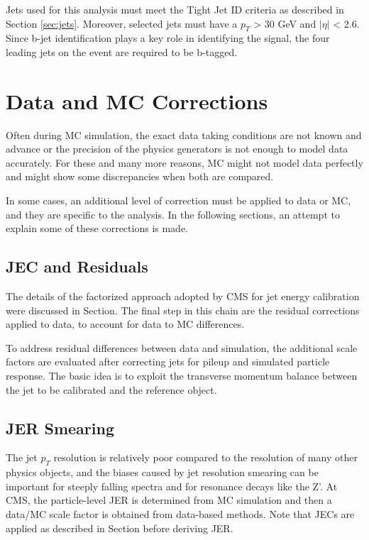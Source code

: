Jets used for this analysis must meet the Tight Jet ID criteria as described in Section \ref{sec:jets}. Moreover, selected jets must have a $p_{T}$ > 30 GeV and $|\eta|$ < 2.6. Since b-jet identification plays a key role in identifying the signal, the four leading jets on the event are required to be b-tagged. 

\section{Data and MC Corrections}

Often during MC simulation, the exact data taking conditions are not known and advance or the precision of the physics generators is not enough to model data accurately. For these and many more reasons, MC might not model data perfectly and might show some discrepancies when both are compared.

In some cases, an additional level of correction must be applied to data or MC, and they are specific to the analysis. In the following sections, an attempt to explain some of these corrections is made.

\subsection{JEC and Residuals}
The details of the factorized approach adopted by CMS for jet energy calibration were discussed in Section. The final step in this chain are the residual corrections applied to data, to account for data to MC differences.

To address residual differences between data and simulation, the additional scale factors are evaluated after correcting jets for pileup and simulated particle response. The basic idea is to exploit the transverse momentum balance between the jet to be calibrated and the reference object.

\subsection{JER Smearing}
The jet $p_{T}$ resolution is relatively poor compared to the resolution of many other physics objects, and the biases caused by jet resolution smearing can be important for steeply falling spectra and for resonance decays like the Z'. At CMS, the particle-level JER is determined from MC simulation and then a data/MC scale factor is obtained from data-based methods. Note that JECs are applied as described in Section before deriving JER.

